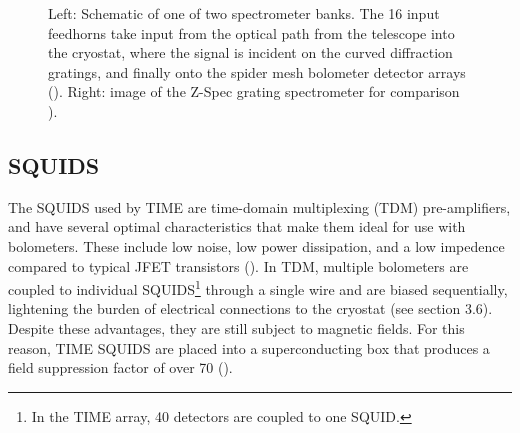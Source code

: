 \documentclass[manuscript]{aastex}
\begin{document}
\begin{figure}[H]%
    \centering
    \qquad
    \singlespace
    \caption[TIME Spectrometer Banks and Detector Modules -(\cite{Hunacek2016})]{Left: Schematic of one of two spectrometer banks. The 16 input feedhorns take input from the optical path from the telescope into the cryostat, where the signal is incident on the curved diffraction gratings, and finally onto the spider mesh bolometer detector arrays (\cite{Hunacek2016}). Right: image of the Z-Spec grating spectrometer for comparison \cite{Crites2014}).}%
    \label{fig:jon2}%
    \vspace{-0.8cm}
\end{figure}
\subsection{\textbf{SQUIDS}}

The SQUIDS used by TIME are time-domain multiplexing (TDM) pre-amplifiers, and have several optimal characteristics that make them ideal for use with bolometers. These include low noise, low power dissipation, and a low impedence compared to typical JFET transistors (\cite{Dobbs2009}). In TDM, multiple bolometers are coupled to individual SQUIDS\footnote{In the TIME array, 40 detectors are coupled to one SQUID.} through a single wire and are biased sequentially, lightening the burden of electrical connections to the cryostat (see section 3.6). Despite these advantages, they are still subject to magnetic fields. For this reason, TIME SQUIDS are placed into a superconducting box that produces a field suppression factor of over 70 (\cite{Hunacek2016b}).
\end{document}
